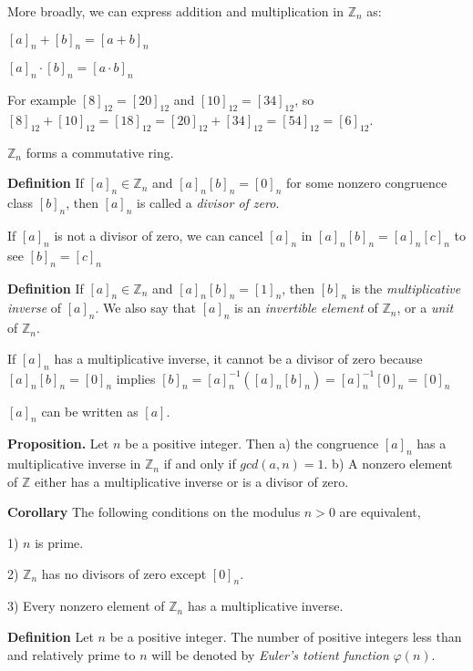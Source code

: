 \documentclass[12pt]{article}
\begin{document}
More broadly, we can express addition and multiplication in $\mathbb{Z}_{n}$ as:

\begin{center}

$[a]_{n} + [b]_{n} = [a + b]_{n}$

$[a]_{n} \cdot [b]_{n} = [a \cdot b]_{n}$

\end{center}

For example $[8]_{12} = [20]_{12}$ and $[10]_{12} = [34]_{12}$, so $[8]_{12} + [10]_{12} = [18]_{12} = [20]_{12} + [34]_{12} = [54]_{12} = [6]_{12}$.

$\mathbb{Z}_{n}$ forms a commutative ring.

\textbf{Definition} If $[a]_{n} \in \mathbb{Z}_{n}$ and $[a]_{n}[b]_{n} = [0]_{n}$ for some nonzero congruence class $[b]_{n}$, then $[a]_{n}$ is called a \textit{divisor of zero}.

If $[a]_{n}$ is not a divisor of zero, we can cancel $[a]_{n}$ in $[a]_{n}[b]_{n} = [a]_{n}[c]_{n}$ to see $[b]_{n}=[c]_{n}$

\textbf{Definition} If $[a]_{n} \in \mathbb{Z}_{n}$ and $[a]_{n}[b]_{n} = [1]_{n}$, then $[b]_{n}$ is the \textit{multiplicative inverse} of $[a]_{n}$. We also say that $[a]_{n}$ is an \textit{invertible element} of $\mathbb{Z}_{n}$, or a \textit{unit} of $\mathbb{Z}_{n}$.

If $[a]_{n}$ has a multiplicative inverse, it cannot be a divisor of zero because $[a]_{n}[b]_{n} = [0]_{n}$ implies $[b]_{n}=[a]_{n}^{-1}([a]_{n}[b]_{n})=[a]_{n}^{-1}[0]_{n}=[0]_{n}$

$[a]_{n}$ can be written as $[a]$.

\textbf{Proposition.} Let $n$ be a positive integer. Then a) the congruence $[a]_{n}$ has a multiplicative inverse in $\mathbb{Z}_{n}$ if and only if $gcd(a,n) = 1$. b) A nonzero element of $\mathbb{Z}$ either has a multiplicative inverse or is a divisor of zero.

\textbf{Corollary} The following conditions on the modulus $n > 0$ are equivalent,

1) $n$ is prime.

2) $\mathbb{Z}_{n}$ has no divisors of zero except $[0]_{n}$.

3) Every nonzero element of $\mathbb{Z}_{n}$ has a multiplicative inverse.

\textbf{Definition} Let $n$ be a positive integer. The number of positive integers less than and relatively prime to $n$ will be denoted by \textit{Euler's totient function} $\varphi (n)$.
\end{document}

